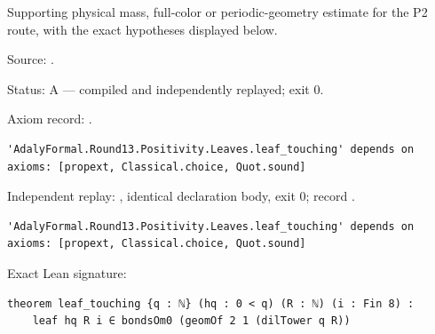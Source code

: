 \begin{theorem}[bp-443]
\label{bp-443}
\leanok
Supporting physical mass, full-color or periodic-geometry estimate for the P2 route, with the exact hypotheses displayed below.

\par Source: \texttt{}.
\par Status: A — compiled and independently replayed; exit 0.
\par Axiom record: \texttt{}.
\begin{verbatim}
'AdalyFormal.Round13.Positivity.Leaves.leaf_touching' depends on axioms: [propext, Classical.choice, Quot.sound]
\end{verbatim}
\par Independent replay: \texttt{}, identical declaration body, exit 0; record \texttt{}.
\begin{verbatim}
'AdalyFormal.Round13.Positivity.Leaves.leaf_touching' depends on axioms: [propext, Classical.choice, Quot.sound]
\end{verbatim}
\par Exact Lean signature:
\begin{verbatim}
theorem leaf_touching {q : ℕ} (hq : 0 < q) (R : ℕ) (i : Fin 8) :
    leaf hq R i ∈ bondsOm0 (geomOf 2 1 (dilTower q R))
\end{verbatim}
\end{theorem}

